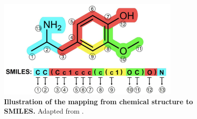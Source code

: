 \begin{figure}[ht!]
    \centering
    \includegraphics[width=0.8\textwidth]{Chapters/Background/Figs/smiles.png}
    \caption{\label{fig:smiles} \textbf{Illustration of the mapping from chemical structure to SMILES.} Adapted from \cite{Kim2021GenerativeCT}.}
\end{figure}





